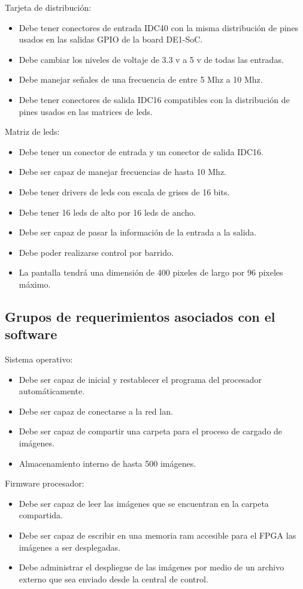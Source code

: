 Tarjeta de distribución:
\begin{itemize}
\item Debe tener conectores de entrada IDC40 con la misma distribución de pines usados en las salidas GPIO de la board DE1-SoC.
\item Debe cambiar los niveles de voltaje de 3.3 v a 5 v de todas las entradas. 
\item Debe manejar señales de una frecuencia de entre 5 Mhz a 10 Mhz.
\item Debe tener conectores de salida IDC16 compatibles con la distribución de pines usados en las matrices de leds.
\end{itemize}
Matriz de leds:
\begin{itemize}
\item Debe tener un conector de entrada y un conector de salida IDC16.
\item Debe ser capaz de manejar frecuencias de hasta 10 Mhz.
\item Debe tener drivers de leds con escala de grises de 16 bits.
\item Debe tener 16 leds de alto por 16 leds de ancho.
\item Debe ser capaz de pasar la información de la entrada a la salida.
\item Debe poder realizarse control por barrido. 
\item La pantalla tendrá una dimensión de 400 pixeles de largo por 96 pixeles máximo.
\end{itemize}

\subsection{Grupos de requerimientos asociados con el software}

Sistema operativo:
\begin{itemize}
\item Debe ser capaz de inicial y restablecer el programa del procesador automáticamente.
\item Debe ser capaz de conectarse a la red lan. 
\item Debe ser capaz de compartir una carpeta para el proceso de cargado de imágenes.
\item Almacenamiento interno de hasta 500 imágenes.
\end{itemize}

Firmware procesador:
\begin{itemize}
\item Debe ser capaz de leer las imágenes que se encuentran en la carpeta compartida.
\item Debe ser capaz de escribir en una  memoria ram accesible para el FPGA  las imágenes a ser desplegadas.
\item Debe administrar el despliegue de las imágenes por medio de un archivo externo que sea enviado desde la central de control.
\end{itemize}
